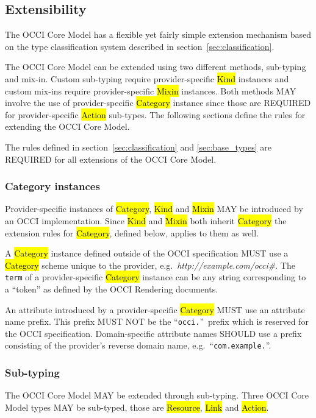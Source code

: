 \documentclass[10pt,a4paper]{article}
\begin{document}
\subsection{Extensibility}
\label{sec:extensibility}
The OCCI Core Model has a flexible yet fairly simple extension
mechanism based on the type classification system described in
section~\ref{sec:classification}.

The OCCI Core Model can be extended using two different methods,
sub-typing and mix-in. Custom sub-typing require provider-specific
\hl{Kind} instances and custom mix-ins require provider-specific
\hl{Mixin} instances.  Both methods MAY involve the use of
provider-specific \hl{Category} instance since those are REQUIRED for
provider-specific \hl{Action} sub-types.  The following sections
define the rules for extending the OCCI Core Model.

The rules defined in section~\ref{sec:classification} and
\ref{sec:base_types} are REQUIRED for all extensions of the OCCI Core
Model.

\subsubsection{Category instances}
\label{sec:ext:category}
Provider-specific instances of \hl{Category}, \hl{Kind} and \hl{Mixin}
MAY be introduced by an OCCI implementation. Since \hl{Kind} and
\hl{Mixin} both inherit \hl{Category} the extension rules for
\hl{Category}, defined below, applies to them as well.

A \hl{Category} instance defined outside of the OCCI specification
MUST use a \hl{Category} scheme unique to the provider,
e.g.~\textit{http://example.com/occi\#}. The {\tt term} of a
provider-specific \hl{Category} instance can be any string
corresponding to a ``token'' as defined by the OCCI Rendering documents.

An attribute introduced by a provider-specific \hl{Category} MUST use
an attribute name prefix. This prefix MUST NOT be the
``\texttt{occi.}''~prefix which is reserved for the OCCI
specification. Domain-specific attribute names SHOULD use a prefix
consisting of the provider's reverse domain name,
e.g.~``\texttt{com.example.}''.

\subsubsection{Sub-typing}
The OCCI Core Model MAY be extended through sub-typing.  Three OCCI
Core Model types MAY be sub-typed, those are \hl{Resource}, \hl{Link}
and \hl{Action}.
\end{document}
